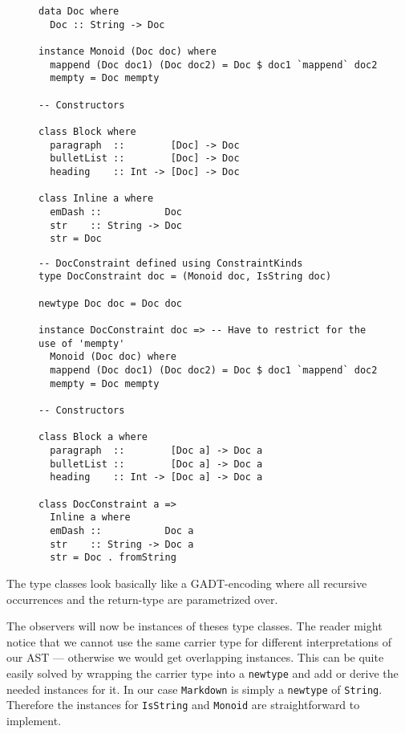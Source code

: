 \documentclass[format=acmsmall, review=true, screen=true]{acmart}
\begin{document}
\begin{figure}
\begin{lstlisting}
data Doc where
  Doc :: String -> Doc

instance Monoid (Doc doc) where
  mappend (Doc doc1) (Doc doc2) = Doc $ doc1 `mappend` doc2
  mempty = Doc mempty

-- Constructors

class Block where
  paragraph  ::        [Doc] -> Doc
  bulletList ::        [Doc] -> Doc
  heading    :: Int -> [Doc] -> Doc

class Inline a where
  emDash ::           Doc
  str    :: String -> Doc
  str = Doc
\end{lstlisting}
\end{figure}

\begin{figure}
\begin{lstlisting}
-- DocConstraint defined using ConstraintKinds
type DocConstraint doc = (Monoid doc, IsString doc)

newtype Doc doc = Doc doc

instance DocConstraint doc => -- Have to restrict for the use of 'mempty'
  Monoid (Doc doc) where
  mappend (Doc doc1) (Doc doc2) = Doc $ doc1 `mappend` doc2
  mempty = Doc mempty

-- Constructors

class Block a where
  paragraph  ::        [Doc a] -> Doc a
  bulletList ::        [Doc a] -> Doc a
  heading    :: Int -> [Doc a] -> Doc a

class DocConstraint a =>
  Inline a where
  emDash ::           Doc a
  str    :: String -> Doc a
  str = Doc . fromString
\end{lstlisting}
\end{figure}

The type classes look basically like a GADT-encoding where all recursive
occurrences and the return-type are parametrized over.

The observers will now be instances of theses type classes. The reader might
notice that we cannot use the same carrier type for different interpretations of
our AST — otherwise we would get overlapping instances. This can be quite easily
solved by wrapping the carrier type into a \texttt{newtype} and add or derive the
needed instances for it. In our case \texttt{Markdown} is simply a \texttt{newtype} of
\texttt{String}. Therefore the instances for \texttt{IsString} and \texttt{Monoid} are
straightforward to implement.
\end{document}
